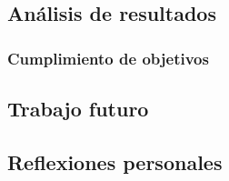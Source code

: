 \subsection{Análisis de resultados}
\subsubsection{Cumplimiento de objetivos}

\subsection{Trabajo futuro}

\subsection{Reflexiones personales}